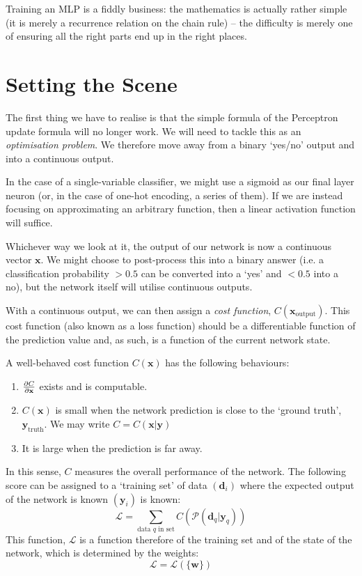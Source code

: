 \documentclass[a4paper,openany,11pt]{book}
\renewcommand\vec[1]{\boldsymbol{\mathbf{#1}}}
\begin{document}
			Training an MLP is a fiddly business: the mathematics is actually rather simple (it is merely a recurrence relation on the chain rule) -- the difficulty is merely one of ensuring all the right parts end up in the right places. 

			\section{Setting the Scene}
				The first thing we have to realise is that the simple formula of the Perceptron update formula will no longer work. We will need to tackle this as an \textit{optimisation problem}. We therefore move away from a binary `yes/no' output and into a continuous output.

				In the case of a single-variable classifier, we might use a sigmoid as our final layer neuron (or, in the case of one-hot encoding, a series of them). If we are instead focusing on approximating an arbitrary function, then a linear activation function will suffice. 

				Whichever way we look at it, the output of our network is now a continuous vector $\vec{x}$. We might choose to post-process this into a binary answer (i.e. a classification probability $>0.5$ can be converted into a `yes' and $<0.5$ into a no), but the network itself will utilise continuous outputs. 

				With a continuous output, we can then assign a \textit{cost function}, $C(\vec{x}_\text{output})$. This cost function (also known as a loss function) should be a differentiable function of the prediction value and, as such, is a function of the current network state. 

				A well-behaved cost function $C(\vec{x})$ has the following behaviours:
				\begin{enumerate}
					\item $\pdiv{C}{\vec{x}}$ exists and is computable. 
					\item $C(\vec{x})$ is small when the network prediction is close to the `ground truth', $\vec{y}_\text{truth}$. We may write $C = C(\vec{x} | \vec{y})$
					\item It is large when the prediction is far away.   
				\end{enumerate}

				In this sense, $C$ measures the overall performance of the network. The following score can be assigned to a `training set' of data $(\vec{d}_i)$ where the expected output of the network is known $(\vec{y}_i)$ is known:
				\begin{equation}
					\mathcal{L} = \sum_{\text{data $q$ in set}} C\left( \mathcal{P}(\vec{d}_q | \vec{y}_q) \right)
				\end{equation}
				This function, $\mathcal{L}$ is a function therefore of the training set and of the state of the network, which is determined by the weights:
				\begin{equation}
					\mathcal{L} = \mathcal{L}\left(\{ \vec{w} \}\right)
				\end{equation}
\end{document}
